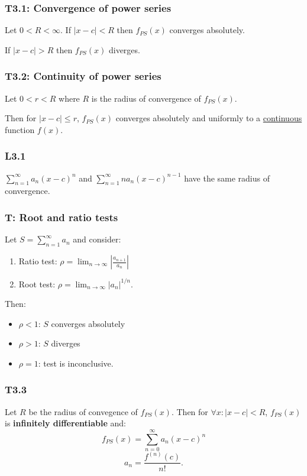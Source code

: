 \documentclass{article}
\begin{document}
\begin{multicols*}{3}
\subsubsection*{T3.1: Convergence of power series}
Let $0<R<\infty$.
If $|x-c|<R$ then
$f_{PS}(x)$ converges absolutely.

If $|x-c|>R$ then $f_{PS}(x)$ diverges.

\subsubsection*{T3.2: Continuity of power series}
Let $0<r<R$ where $R$ is the radius of
convergence of $f_{PS}(x)$.

Then for $|x-c|\leq r$, $f_{PS}(x)$
converges absolutely and uniformly
to a \underline{continuous} function $f(x)$.

\subsubsection*{L3.1}
$\displaystyle\sum_{n=1}^{\infty}a_n(x-c)^n$
and $\displaystyle\sum_{n=1}^{\infty}n a_n(x-c)^{n-1}$
have the same radius of convergence.

\subsubsection*{T: Root and ratio tests}
Let $\displaystyle S=\sum_{n=1}^{\infty}a_n$
and consider:
\begin{enumerate}
    \item Ratio test: $\displaystyle\rho=\lim_{n\rightarrow\infty}
    \left|\frac{a_{n+1}}{a_n}\right|$

    \item Root test: $\displaystyle\rho=
    \lim_{n\rightarrow\infty}|a_n|^{1/n}$.
\end{enumerate}
Then:
\begin{itemize}
    \item $\rho<1$: $S$ converges absolutely
    \item $\rho>1$: $S$ diverges
    \item $\rho=1$: test is inconclusive.
\end{itemize}

\subsubsection*{T3.3}
Let $R$ be the radius of convegence of
$f_{PS}(x)$. Then for $\forall x:|x-c|<R$,
$f_{PS}(x)$ is \textbf{infinitely differentiable} and:
$$f_{PS}(x)=\sum_{n=0}^{\infty}a_n(x-c)^n$$
$$a_n=\frac{f^{(n)}(c)}{n!}.$$


\end{multicols*}
\end{document}
